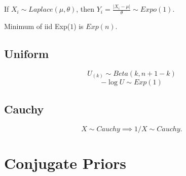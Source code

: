 \documentclass{article}
\begin{document}
If $X_i \sim Laplace(\mu, \theta)$, then $Y_i = \frac{|X_i - \mu|}{\theta} \sim Expo(1)$. 

Minimum of iid Exp($1$) is $Exp(n)$. 
\subsection{Uniform}
$$U_{(k)} \sim Beta(k, n+1-k)$$
$$-\log U \sim Exp(1)$$

\subsection{Cauchy}
$$X \sim Cauchy \implies 1/X \sim Cauchy.$$
\section{Conjugate Priors}
\end{document}

